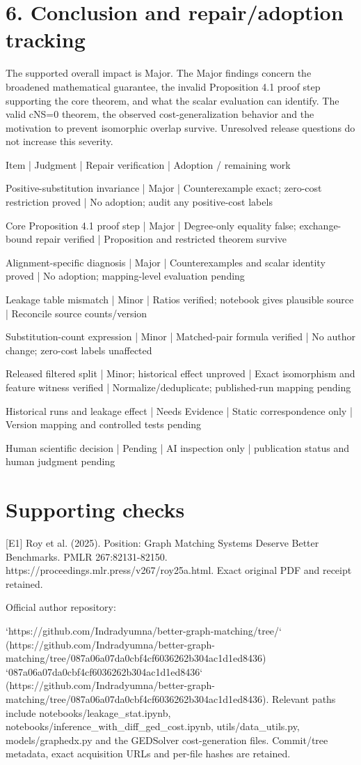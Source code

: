 \documentclass[10pt]{article}
\begin{document}
\section*{6. Conclusion and repair/adoption tracking}
The supported overall impact is Major. The Major findings concern the broadened mathematical guarantee, the invalid Proposition 4.1 proof step supporting the core theorem, and what the scalar evaluation can identify. The valid cNS=0 theorem, the observed cost-generalization behavior and the motivation to prevent isomorphic overlap survive. Unresolved release questions do not increase this severity.\par
Item | Judgment | Repair verification | Adoption / remaining work\par
Positive-substitution invariance | Major | Counterexample exact; zero-cost restriction proved | No adoption; audit any positive-cost labels\par
Core Proposition 4.1 proof step | Major | Degree-only equality false; exchange-bound repair verified | Proposition and restricted theorem survive\par
Alignment-specific diagnosis | Major | Counterexamples and scalar identity proved | No adoption; mapping-level evaluation pending\par
Leakage table mismatch | Minor | Ratios verified; notebook gives plausible source | Reconcile source counts/version\par
Substitution-count expression | Minor | Matched-pair formula verified | No author change; zero-cost labels unaffected\par
Released filtered split | Minor; historical effect unproved | Exact isomorphism and feature witness verified | Normalize/deduplicate; published-run mapping pending\par
Historical runs and leakage effect | Needs Evidence | Static correspondence only | Version mapping and controlled tests pending\par
Human scientific decision | Pending | AI inspection only | publication status and human judgment pending\par
\section*{Supporting checks}
[E1] Roy et al. (2025). Position: Graph Matching Systems Deserve Better Benchmarks. PMLR 267:82131-82150. https://proceedings.mlr.press/v267/roy25a.html. Exact original PDF and receipt retained.\par
Official author repository:\par
`https://github.com/Indradyumna/better-graph-matching/tree/` (https://github.com/Indradyumna/better-graph-matching/tree/087a06a07da0cbf4cf6036262b304ac1d1ed8436)
`087a06a07da0cbf4cf6036262b304ac1d1ed8436` (https://github.com/Indradyumna/better-graph-matching/tree/087a06a07da0cbf4cf6036262b304ac1d1ed8436). Relevant paths include notebooks/leakage\_stat.ipynb, notebooks/inference\_with\_diff\_ged\_cost.ipynb, utils/data\_utils.py, models/graphedx.py and the GEDSolver cost-generation files. Commit/tree metadata, exact acquisition URLs and per-file hashes are retained.\par
\end{document}
